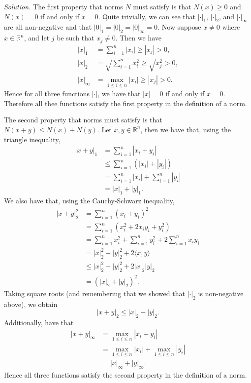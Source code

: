 \documentclass{article}
\newcommand{\R}{\mathbb{R}}
\begin{document}
\textit{Solution.}
The first property that norms $N$ must satisfy is that $N(x) \geq 0$ and
$N(x) = 0$ if and only if $x = 0$. Quite trivially, we can see
that $|\cdot|_1$, $|\cdot|_2$, and $|\cdot|_\infty$ are all non-negative
and that $|0|_1 = |0|_2 = |0|_\infty = 0$. Now suppose $x \neq 0$ where $x \in \R^n$,
and let $j$ be such that $x_j \neq 0$. Then we have
%
\begin{align*}
    |x|_1 &= \sum_{i = 1}^n |x_i| \geq |x_j| > 0, \\
    |x|_2 &= \sqrt{\sum_{i = 1}^n x_i^2} \geq \sqrt{x_j^2} > 0, \\
    |x|_\infty &= \max_{1 \leq i \leq n} |x_i| \geq |x_j| > 0.
\end{align*}
%
Hence for all three functions $|\cdot|$, we have that $|x| = 0$ if and only if $x = 0$.
Therefore all thee functions satisfy the first property in the definition of a norm.

The second property that norms must satisfy is that $N(x + y) \leq N(x) + N(y)$.
Let $x, y \in \R^n$, then we have that, using the triangle inequality,
%
\begin{align*}
    |x + y|_1
        &= \sum_{i = 1}^n |x_i + y_i| \\
        &\leq \sum_{i = 1}^n (|x_i| + |y_i|) \\
        &= \sum_{i = 1}^n |x_i| + \sum_{i = 1}^n |y_i| \\
        &= |x|_1 + |y|_1
        .
\end{align*}
%
We also have that, using the Cauchy-Schwarz inequality,
%
\begin{align*}
    |x + y|_2^2
        &= \sum_{i = 1}^n (x_i + y_i)^2 \\
        &= \sum_{i = 1}^n (x_i^2 + 2 x_i y_i +  y_i^2) \\
        &= \sum_{i = 1}^n x_i^2
            + \sum_{i = 1}^n  y_i^2
            + 2 \sum_{i = 1}^n x_i y_i \\
        &= |x|_2^2 + |y|_2^2 + 2 \langle x, y \rangle \\
        &\leq |x|_2^2 + |y|_2^2 + 2 |x|_2 |y|_2 \\
        &= (|x|_2 + |y|_2)^2
        .
\end{align*}
%
Taking square roots (and remembering that we showed that $|\cdot|_2$
is non-negative above), we obtain
%
\begin{equation*}
    |x + y|_2 \leq |x|_2 + |y|_2
    .
\end{equation*}
%
Additionally, have that
%
\begin{align*}
    |x + y|_\infty
        &= \max_{1 \leq i \leq n} |x_i + y_i| \\
        &= \max_{1 \leq i \leq n} |x_i|
            + \max_{1 \leq i \leq n} |y_i| \\
        &= |x|_\infty + |y|_\infty
        .
\end{align*}
%
Hence all three functions satisfy the second property in the definition of a norm.
\end{document}
